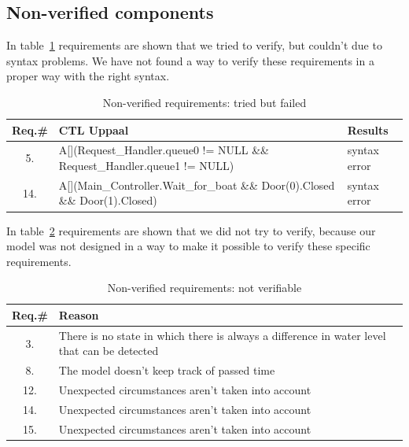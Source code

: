 \documentclass{article}
\begin{document}
      \newpage  
      
    \subsection{Non-verified components} 
    In table~\ref{tab:nonver_failed} requirements are shown that we tried to verify, but couldn't due to syntax problems. We have not found a way to verify these requirements in a proper way with the right syntax. 
    
     \begin{table}[h]
            \centering
            \begin{tabular}{|c|p{8cm}|p{2cm}|}
                \hline
              \textbf{Req.\#}  & \textbf{CTL Uppaal} &\textbf{Results}\\
              \hline
              5. & A[](Request\_Handler.queue0 != NULL \&\& Request\_Handler.queue1  != NULL) & syntax error \\
              \hline
              14. & A[](Main\_Controller.Wait\_for\_boat \&\& Door(0).Closed \&\& Door(1).Closed) & syntax error \\
              \hline
              \end{tabular}
            \caption{Non-verified requirements: tried but failed}
            \label{tab:nonver_failed}
        \end{table} 

    In table~\ref{tab:nonver_notver} requirements are shown that we did not try to verify, because our model was not designed in a way to make it possible to verify these specific requirements. 
    
        \begin{table}[h]
            \centering
            \begin{tabular}{|c|p{8cm}|}
                \hline
              \textbf{Req.\#}  & \textbf{Reason} \\
              \hline
              3. &  There is no state in which there is always a difference in water level that can be detected \\
              \hline
              8. &  The model doesn't keep track of passed time \\
              \hline
              12. & Unexpected circumstances aren't taken into account\\
              \hline 
              14. & Unexpected circumstances aren't taken into account\\
              \hline 
              15. & Unexpected circumstances aren't taken into account\\
              \hline
              \end{tabular}
            \caption{Non-verified requirements: not verifiable}
            \label{tab:nonver_notver}
        \end{table}
\end{document}
